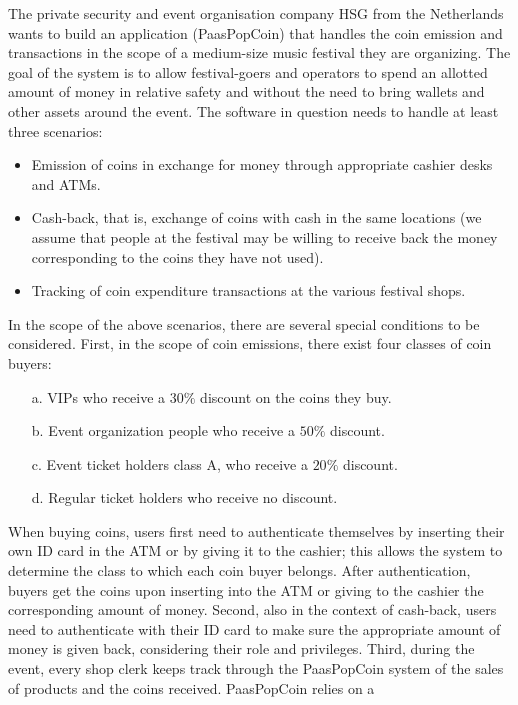 \documentclass[12pt, a4paper]{report}
\newtheorem[style=M,bodystyle=\normalfont]{theorem}{Theorem}
\newtheorem[style=M,bodystyle=\normalfont]{corollary}{Corollary}
\newtheorem[style=M,bodystyle=\normalfont]{lemma}{Lemma}
\newtheorem[style=M,bodystyle=\normalfont]{definition}{Definition}
\begin{document}
    \begin{Exercise}[label=2]
        The private security and event organisation company HSG from the Netherlands wants to build an application (PaasPopCoin) that handles the coin emission and transactions in 
        the scope of a medium-size music festival they are organizing. The goal of the system is to allow festival-goers and operators to spend an allotted amount of money in 
        relative safety and without the need to bring wallets and other assets around the event. The software in question needs to handle at least three scenarios:
        \begin{itemize}
            \item Emission of coins in exchange for money through appropriate cashier desks and ATMs.
            \item Cash-back, that is, exchange of coins with cash in the same locations (we assume that people at the festival may be willing to receive back the money corresponding
                to the coins they have not used).
            \item Tracking of coin expenditure transactions at the various festival shops.
        \end{itemize}
        In the scope of the above scenarios, there are several special conditions to be considered. First, in the scope of coin emissions, there exist four classes of coin buyers: 
        \begin{itemize}
            \item [a.] VIPs who receive a $30\%$ discount on the coins they buy. 
            \item [b.] Event organization people who receive a $50\%$ discount. 
            \item [c.] Event ticket holders class A, who receive a $20\%$ discount. 
            \item [d.] Regular ticket holders who receive no discount.
        \end{itemize}
        When buying coins, users first need to authenticate themselves by inserting their own ID card in the ATM or by giving it to the cashier; this allows the system to determine 
        the class to which each coin buyer belongs. After authentication, buyers get the coins upon inserting into the ATM or giving to the cashier the corresponding amount of money.
        Second, also in the context of cash-back, users need to authenticate with their ID card to make sure the appropriate amount of money is given back, considering their role and 
        privileges. Third, during the event, every shop clerk keeps track through the PaasPopCoin system of the sales of products and the coins received. PaasPopCoin relies on a 

\end{Exercise}
\end{document}
